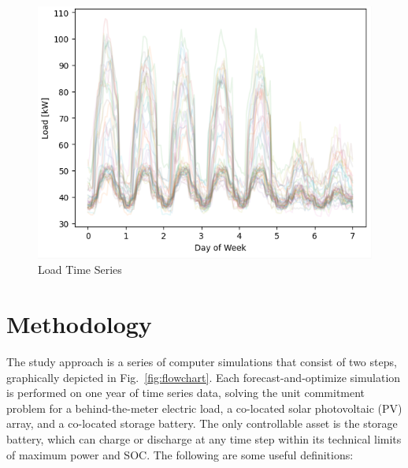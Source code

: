 \documentclass[conference]{IEEEtran}
\begin{document}
\begin{figure}
    \centering
    \includegraphics[width=1\linewidth]{images/weekly.png}
    \caption{Load Time Series}
    \label{fig:data-weekly}
\end{figure}

\section{Methodology}

The study approach is a series of computer simulations that consist of two steps, graphically depicted in Fig.~\ref{fig:flowchart}. Each forecast-and-optimize simulation is performed on one year of time series data, solving the unit commitment problem for a behind-the-meter electric load, a co-located solar photovoltaic (PV) array, and a co-located storage battery. The only controllable asset is the storage battery, which can charge or discharge at any time step within its technical limits of maximum power and SOC. The following are some useful definitions:
\end{document}
